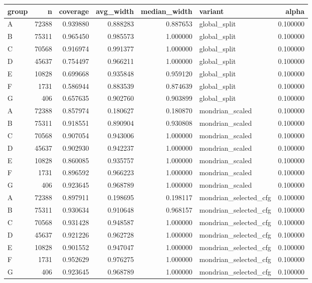 \begin{tabular}{lrrrrlr}
\toprule
group & n & coverage & avg_width & median_width & variant & alpha \\
\midrule
A & 72388 & 0.939880 & 0.888283 & 0.887653 & global_split & 0.100000 \\
B & 75311 & 0.965450 & 0.985573 & 1.000000 & global_split & 0.100000 \\
C & 70568 & 0.916974 & 0.991377 & 1.000000 & global_split & 0.100000 \\
D & 45637 & 0.754497 & 0.966211 & 1.000000 & global_split & 0.100000 \\
E & 10828 & 0.699668 & 0.935848 & 0.959120 & global_split & 0.100000 \\
F & 1731 & 0.586944 & 0.883539 & 0.874639 & global_split & 0.100000 \\
G & 406 & 0.657635 & 0.902760 & 0.903899 & global_split & 0.100000 \\
A & 72388 & 0.857974 & 0.180627 & 0.180870 & mondrian_scaled & 0.100000 \\
B & 75311 & 0.918551 & 0.890904 & 0.930808 & mondrian_scaled & 0.100000 \\
C & 70568 & 0.907054 & 0.943006 & 1.000000 & mondrian_scaled & 0.100000 \\
D & 45637 & 0.902930 & 0.942237 & 1.000000 & mondrian_scaled & 0.100000 \\
E & 10828 & 0.860085 & 0.935757 & 1.000000 & mondrian_scaled & 0.100000 \\
F & 1731 & 0.896592 & 0.966223 & 1.000000 & mondrian_scaled & 0.100000 \\
G & 406 & 0.923645 & 0.968789 & 1.000000 & mondrian_scaled & 0.100000 \\
A & 72388 & 0.897911 & 0.198695 & 0.198117 & mondrian_selected_cfg & 0.100000 \\
B & 75311 & 0.930634 & 0.910648 & 0.968157 & mondrian_selected_cfg & 0.100000 \\
C & 70568 & 0.931428 & 0.948587 & 1.000000 & mondrian_selected_cfg & 0.100000 \\
D & 45637 & 0.921226 & 0.962728 & 1.000000 & mondrian_selected_cfg & 0.100000 \\
E & 10828 & 0.901552 & 0.947047 & 1.000000 & mondrian_selected_cfg & 0.100000 \\
F & 1731 & 0.952629 & 0.976275 & 1.000000 & mondrian_selected_cfg & 0.100000 \\
G & 406 & 0.923645 & 0.968789 & 1.000000 & mondrian_selected_cfg & 0.100000 \\

\end{tabular}
